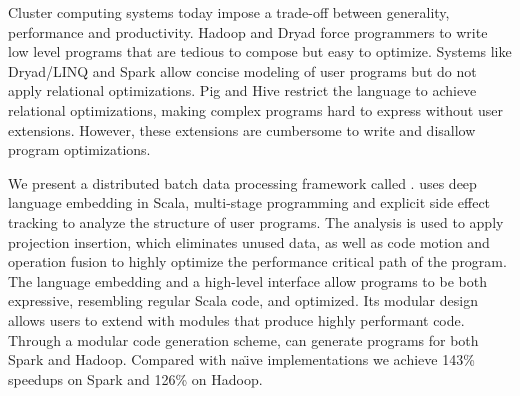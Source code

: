 Cluster computing systems today impose a trade-off between generality,
performance and productivity. Hadoop and Dryad force programmers to write low
level programs that are tedious to compose but easy to optimize. Systems like
Dryad/LINQ and Spark allow concise modeling of user programs but do not apply
relational optimizations. Pig and Hive restrict the language to achieve
relational optimizations, making complex programs hard to express without user
extensions. However, these extensions are cumbersome to write and disallow
program optimizations.

We present a distributed batch data processing framework called \tool.
\tool uses deep language embedding in Scala, multi-stage programming and
explicit side effect tracking to analyze the structure of user programs. The
analysis is used to apply projection insertion, which eliminates unused data, as
well as code motion and operation fusion to highly optimize the performance
critical path of the program. The language embedding and a high-level interface
allow \tool programs to be both expressive, resembling regular Scala code, and
optimized. Its modular design allows users to extend \tool with modules that
produce highly performant code. Through a modular code generation scheme, \tool
can generate programs for both Spark and Hadoop. Compared with na\"{\i}ve
implementations we achieve 143\% speedups on Spark and 126\% on Hadoop.
